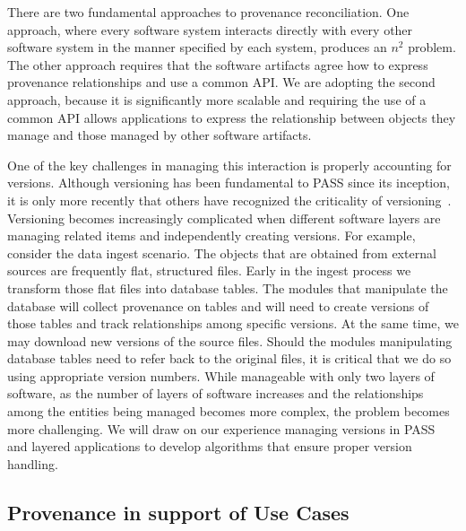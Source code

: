 \documentclass[10pt]{article}
\begin{document}
There are two fundamental approaches to provenance reconciliation.
One approach, where every software system interacts directly with every
other software system in the manner specified by each system, produces
an $n^2$ problem.
The other approach requires that the software artifacts agree how to
express provenance relationships and use a common API.
We are adopting the second approach, because it is significantly more
scalable and requiring the use of a common API allows applications
to express the relationship between objects they manage and those managed
by other software artifacts.

One of the key challenges in managing this interaction is properly accounting
for versions.
Although versioning has been fundamental to PASS since its inception, it
is only more recently that others have recognized the criticality of
versioning~\cite{lyle,fonseca,zhou}.
Versioning becomes increasingly complicated when different software layers
are managing related items and independently creating versions.
For example, consider the data ingest scenario.
The objects that are obtained from external sources are frequently flat,
structured files.
Early in the ingest process we transform those flat files into database
tables.
The modules that manipulate the database will collect provenance on
tables and will need to create versions of those tables and track
relationships among specific versions.
At the same time, we may download new versions of the source files.
Should the modules manipulating database tables need to refer back to
the original files, it is critical that we do so using appropriate version
numbers.
While manageable with only two layers of software, as the number of layers
of software increases and the relationships among the entities being managed
becomes more complex, the problem becomes more challenging.
We will draw on our experience managing versions in PASS and layered
applications to develop algorithms that ensure proper version handling.

\subsection{Provenance in support of Use Cases}
\label{sec:use}
\end{document}
